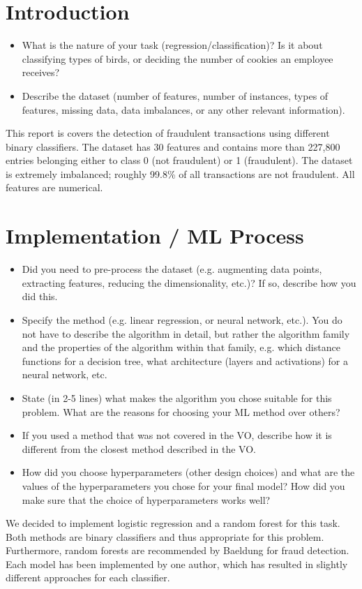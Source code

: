\documentclass[a4, 10 pt, conference]{ieeeconf}  %
\begin{document}
\section{Introduction}
\label{sec:intro}

{\color{blue}

\begin{itemize}
	\item What is the nature of your task (regression/classification)? Is it about classifying types of birds, or deciding the number of cookies an employee receives?
	\item Describe the dataset (number of features, number of instances, types of features, missing data, data imbalances, or any other relevant information).
\end{itemize}
}

This report is covers the detection of fraudulent transactions using different binary classifiers. The dataset has 30 features and contains more than 227,800 entries belonging either to class 0 (not fraudulent) or 1 (fraudulent). The dataset is extremely imbalanced; roughly 99.8\% of all transactions are not fraudulent. All features are numerical.
\section{Implementation / ML Process}
\label{sec:methods}

{\color{blue}

\begin{itemize}
	\item Did you need to pre-process the dataset (e.g. augmenting data points, extracting features, reducing the dimensionality, etc.)? If so, describe how you did this.
	\item Specify the method (e.g. linear regression, or neural network, etc.). You do not have to describe the algorithm in detail, but rather the algorithm family and the properties of the algorithm within that family, e.g. which distance functions for a decision tree, what architecture (layers and activations) for a neural network, etc. 
	\item State (in 2-5 lines) what makes the algorithm you chose suitable for this problem. What are the reasons for choosing your ML method over others?
    \item If you used a method that was not covered in the VO, describe how it is different from the closest method described in the VO.
	\item How did you choose hyperparameters (other design choices) and what are the values of the hyperparameters you chose for your final model? How did you make sure that the choice of hyperparameters works well?
\end{itemize}
}
We decided to implement logistic regression and a random forest for this task. Both methods are binary classifiers and thus appropriate for this problem. Furthermore, random forests are recommended by Baeldung for fraud detection\cite{baeldung}. Each model has been implemented by one author, which has resulted in slightly different approaches for each classifier.
\end{document}

